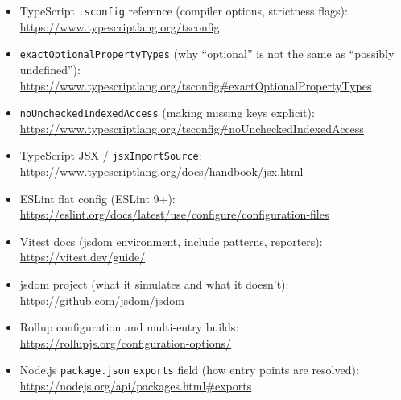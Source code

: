 \begin{itemize}
\item TypeScript \texttt{tsconfig} reference (compiler options, strictness flags):
\href{https://www.typescriptlang.org/tsconfig}{https://www.typescriptlang.org/tsconfig}
\item \texttt{exactOptionalPropertyTypes} (why ``optional'' is not the same as ``possibly undefined''):
\href{https://www.typescriptlang.org/tsconfig#exactOptionalPropertyTypes}{https://www.typescriptlang.org/tsconfig\#exactOptionalPropertyTypes}
\item \texttt{noUncheckedIndexedAccess} (making missing keys explicit):
\href{https://www.typescriptlang.org/tsconfig#noUncheckedIndexedAccess}{https://www.typescriptlang.org/tsconfig\#noUncheckedIndexedAccess}
\item TypeScript JSX / \texttt{jsxImportSource}:
\href{https://www.typescriptlang.org/docs/handbook/jsx.html}{https://www.typescriptlang.org/docs/handbook/jsx.html}
\item ESLint flat config (ESLint 9+):
\href{https://eslint.org/docs/latest/use/configure/configuration-files}{https://eslint.org/docs/latest/use/configure/configuration-files}
\item Vitest docs (jsdom environment, include patterns, reporters):
\href{https://vitest.dev/guide/}{https://vitest.dev/guide/}
\item jsdom project (what it simulates and what it doesn't):
\href{https://github.com/jsdom/jsdom}{https://github.com/jsdom/jsdom}
\item Rollup configuration and multi-entry builds:
\href{https://rollupjs.org/configuration-options/}{https://rollupjs.org/configuration-options/}
\item Node.js \texttt{package.json} \texttt{exports} field (how entry points are resolved):
\href{https://nodejs.org/api/packages.html#exports}{https://nodejs.org/api/packages.html\#exports}
\end{itemize}

